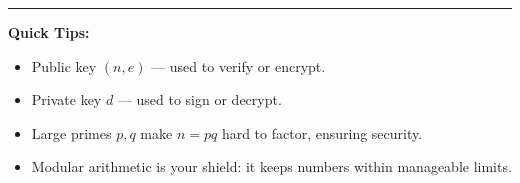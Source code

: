 \documentclass[12pt]{article}
\begin{document}
\vspace{1em}
\hrule
\textbf{Quick Tips:}
\begin{itemize}[leftmargin=1.25em]
  \item Public key \( (n, e) \) — used to verify or encrypt.
  \item Private key \( d \) — used to sign or decrypt.
  \item Large primes \( p, q \) make \( n = pq \) hard to factor, ensuring security.
  \item Modular arithmetic is your shield: it keeps numbers within manageable limits.
\end{itemize}
\end{document}
